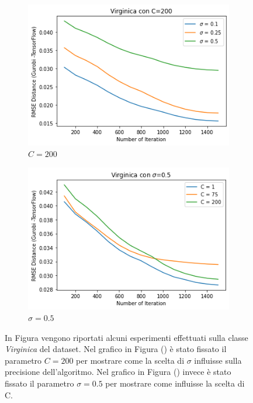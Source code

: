 \documentclass[a4paper,12pt]{report}
\begin{document}
\begin{figure}[H]
    \begin{subfigure}{0.47\textwidth}
        \centering
        \includegraphics[scale=0.5]{images/Grafici/Virginica_C200_sigmaDiversi.png}
        \caption{$C=200$}
        \label{subfig:Virginica_C200_sigmaDiversi}
    \end{subfigure}
    \begin{subfigure}{0.47\textwidth}
        \centering
        \includegraphics[scale=0.5]{images/Grafici/Virginica_Cdiversi_sigma05.png}
        \caption{$\sigma=0.5$}
        \label{subfig:Virginica_Cdiversi_sigma05}
    \end{subfigure}
    \caption{In Figura vengono riportati alcuni esperimenti effettuati sulla classe \textit{Virginica} del dataset. Nel grafico in Figura () è stato fissato il parametro $C=200$ per mostrare come la scelta di $\sigma$ influisse sulla precisione dell'algoritmo. Nel grafico in Figura () invece è stato fissato il parametro $\sigma = 0.5$ per mostrare come influisse la scelta di C.}
    \label{fig:Virginica_Preliminari}
\end{figure}
\end{document}
